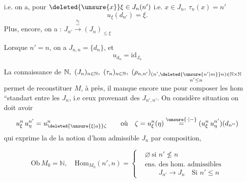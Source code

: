 i.e. on a, pour \(\deleted{\unsure{x}}\xi\in J_n(n')\) i.e. \(x\in J_n,\ \tau_n(x)=n'\)
\[
 u_\xi(d_{n'})=\xi .
\]
 Plus,  encore, on a :  \(J_{n'}\xrightarrow{\overset{u_\xi}{\sim}}(J_n)_{\leq\xi}\)

Lorsque \(n'=n\), on a \(J_{n,n}=\{d_n\}\), et
\[
 u_{d_n}=\mathrm{id}_{J_n}
\]

La connaissance de \(\mathbb N,\ (J_n)_{n\in\mathbb N},\ (\tau_n)_{n\in\mathbb N},\
(\rho_{n,n'})_{\substack{(n',\deleted{\unsure{n'|m}}n)\in\mathbb N\times\mathbb N\\ n'\leq n}}\) permet de reconstituer   \(M\), à   près, il manque encore une   pour composer les hom ``standart entre les \(J_n\), i.e ceux provenant des \(J_{n',n'}\).  On considère  situation
on doit avoir
\[
 u_\xi^n\,u_\eta^{n'}=u_{\deleted{\unsure{\xi|a}}\zeta}^{n}
 \qquad\text{où}\quad \zeta=u_\xi^n(\eta)\overset{\unsure{\cdot|-}}{=}
 (u_\xi^n\,u_\eta^{n'})(d_{n''})
\]
qui exprime la   de la notion d'hom admissible  \(J_n\) par composition,

 
\[
 \mathrm{Ob}\,M_0=\mathbb N,\quad \mathrm{Hom}_{M_0}(n',n)=
 \left\{\begin{aligned}
 &\varnothing\ \text{si }n'\nleq n\\
 &\text{ens. des hom. admissibles}\\
 &\qquad J_{n'}\to J_n\quad\text{Si }n'\leq n
 \end{aligned}\right.
\]

